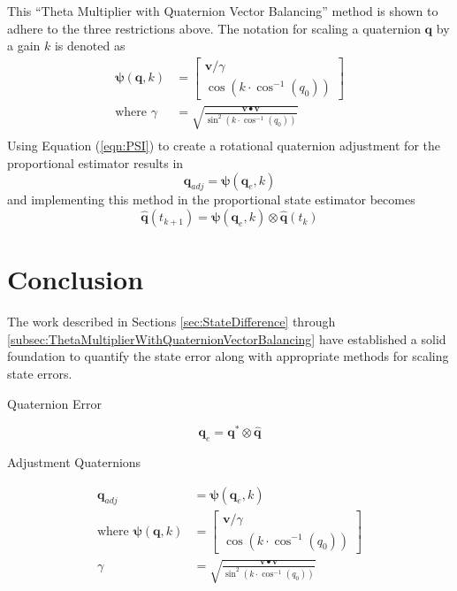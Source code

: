 \documentclass[]{aiaa-tc}%
\newcommand{\bs}[1]{\boldsymbol{#1}}
\begin{document}
This ``Theta Multiplier with Quaternion Vector Balancing'' method is shown to adhere to the three restrictions above.  The notation for scaling a quaternion $\bs{q}$ by a gain $k$ is denoted as
\begin{equation}
  \begin{aligned}
    \bs{\psi}(\bs{q}, k) &= \begin{bmatrix} \bs{v} / \gamma \\ \cos ( k \cdot \cos^{-1} (q_0))  \end{bmatrix} \\
    \text{where } \gamma &= \sqrt{\frac{\bs{v} \bullet \bs{v}}{\sin^2 ( k \cdot \cos^{-1} (q_0))}} \\
  \end{aligned}
  \label{eqn:PSI}
\end{equation}
Using Equation (\ref{eqn:PSI}) to create a rotational quaternion adjustment for the proportional estimator results in
\begin{equation}
  \bs{q}_{adj} = \bs{\psi}(\bs{q}_e, k)
  \label{eqn:PEstimatorAngleMultiplierwithVectorMagnitudeNormalization}
\end{equation}
and implementing this method in the proportional state estimator becomes
\begin{equation}
  \bs{\hat{q}}(t_{k+1}) = \bs{\psi}(\bs{q}_e, k) \otimes \bs{\hat{q}}(t_{k})
\end{equation}

\section{Conclusion}
\label{sec:Conclusion}

The work described in Sections \ref{sec:StateDifference} through \ref{subsec:ThetaMultiplierWithQuaternionVectorBalancing} have established a solid foundation to quantify the state error along with appropriate methods for scaling state errors.

Quaternion Error

\begin{equation}
  \bs{q}_e = \bs{q}^* \otimes \bs{\hat{q}}
\end{equation}

Adjustment Quaternions

\begin{equation}
  \begin{aligned}
    \bs{q}_{adj} &= \bs{\psi}(\bs{q}_e, k) \\
    \text{where } \bs{\psi}(\bs{q}, k) &= \begin{bmatrix} \bs{v} / \gamma \\ \cos ( k \cdot \cos^{-1} (q_0))  \end{bmatrix} \\
    \gamma &= \sqrt{\frac{\bs{v} \bullet \bs{v}}{\sin^2 ( k \cdot \cos^{-1} (q_0))}}
  \end{aligned}
\end{equation}
\end{document}
